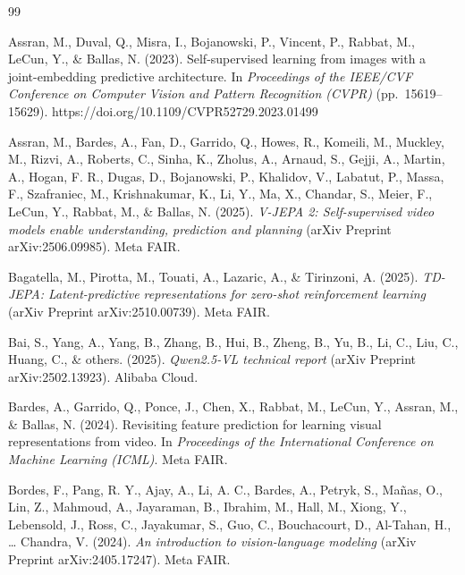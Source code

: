 \begin{thebibliography}{99}

Assran, M., Duval, Q., Misra, I., Bojanowski, P., Vincent, P., Rabbat, M., LeCun, Y., \& Ballas, N. (2023). Self-supervised learning from images with a joint-embedding predictive architecture. In \textit{Proceedings of the IEEE/CVF Conference on Computer Vision and Pattern Recognition (CVPR)} (pp.~15619--15629). https://doi.org/10.1109/CVPR52729.2023.01499

Assran, M., Bardes, A., Fan, D., Garrido, Q., Howes, R., Komeili, M., Muckley, M., Rizvi, A., Roberts, C., Sinha, K., Zholus, A., Arnaud, S., Gejji, A., Martin, A., Hogan, F. R., Dugas, D., Bojanowski, P., Khalidov, V., Labatut, P., Massa, F., Szafraniec, M., Krishnakumar, K., Li, Y., Ma, X., Chandar, S., Meier, F., LeCun, Y., Rabbat, M., \& Ballas, N. (2025). \textit{V-JEPA 2: Self-supervised video models enable understanding, prediction and planning} (arXiv Preprint arXiv:2506.09985). Meta FAIR.

Bagatella, M., Pirotta, M., Touati, A., Lazaric, A., \& Tirinzoni, A. (2025). \textit{TD-JEPA: Latent-predictive representations for zero-shot reinforcement learning} (arXiv Preprint arXiv:2510.00739). Meta FAIR.

Bai, S., Yang, A., Yang, B., Zhang, B., Hui, B., Zheng, B., Yu, B., Li, C., Liu, C., Huang, C., \& others. (2025). \textit{Qwen2.5-VL technical report} (arXiv Preprint arXiv:2502.13923). Alibaba Cloud.

Bardes, A., Garrido, Q., Ponce, J., Chen, X., Rabbat, M., LeCun, Y., Assran, M., \& Ballas, N. (2024). Revisiting feature prediction for learning visual representations from video. In \textit{Proceedings of the International Conference on Machine Learning (ICML)}. Meta FAIR.

Bordes, F., Pang, R. Y., Ajay, A., Li, A. C., Bardes, A., Petryk, S., Mañas, O., Lin, Z., Mahmoud, A., Jayaraman, B., Ibrahim, M., Hall, M., Xiong, Y., Lebensold, J., Ross, C., Jayakumar, S., Guo, C., Bouchacourt, D., Al-Tahan, H., \dots{} Chandra, V. (2024). \textit{An introduction to vision-language modeling} (arXiv Preprint arXiv:2405.17247). Meta FAIR.


\end{thebibliography}
